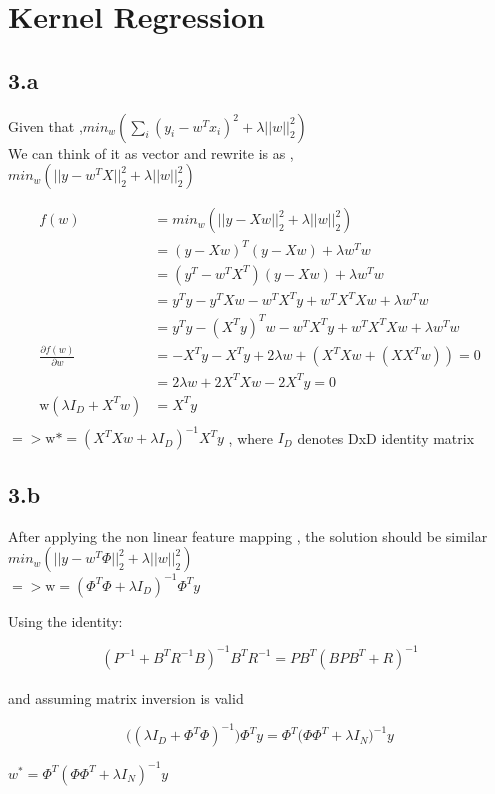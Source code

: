 \documentclass[10pt,letterpaper]{article}
\begin{document}
\section{Kernel Regression}
\subsection{3.a}
Given that ,$min_w(\sum_i (y_i-w^Tx_i)^2+ \lambda||w||_2^2)$	\\		
		We can think of it as vector and rewrite is as ,\\
		$min_w(||y-w^TX||_2^2 + \lambda||w||_2^2)$
		
		\begin{align*}
		f(w) &= min_w(||y-Xw||_2^2 + \lambda||w||_2^2)\\
		&= (y-Xw)^T(y-Xw) + \lambda w^Tw\\
		&= (y^T-w^TX^T)(y-Xw) + \lambda w^Tw\\
		&= y^Ty - y^TXw -w^TX^Ty + w^TX^TXw + \lambda w^Tw\\
		&= y^Ty - {(X^Ty)}^Tw -w^TX^Ty + w^TX^TXw	 + \lambda w^Tw\\
		\frac{\partial f(w)}{\partial w} &= -X^Ty - X^Ty + 2\lambda w + (X^TXw + (XX^Tw)) = 0\\
		&= 2\lambda w +2X^TXw -2X^Ty = 0\\
		\text{w}(\lambda I_D + X^Tw) &= X^Ty\\
		\end{align*}
$=>\text{w*} = (X^TXw + \lambda I_D)^{-1}X^Ty$ , where $ I_D$ denotes DxD identity matrix
\subsection{3.b}

		After applying the non linear feature mapping , the solution should be similar \\
		$min_w(||y-w^T\Phi||_2^2 + \lambda||w||_2^2)$\\

		$=>\text{{w}} = (\Phi^T\Phi + \lambda I_D)^{-1}\Phi^Ty$
		
		Using the identity:
		
		$$(P^{-1}+B^TR^{-1}B)^{-1}B^TR^{-1} = PB^T(BPB^T+R)^{-1}$$\\
		and assuming matrix inversion is valid
		
		$$\big((\lambda I_D + \Phi^T\Phi)^{-1}\big)\Phi^Ty =  \Phi^T\big(\Phi\Phi^T + \lambda I_N\big)^{-1}y$$
		
		${w^{*} = \Phi^T(\Phi\Phi^T + \lambda I_N)^{-1} y}$
\end{document}
